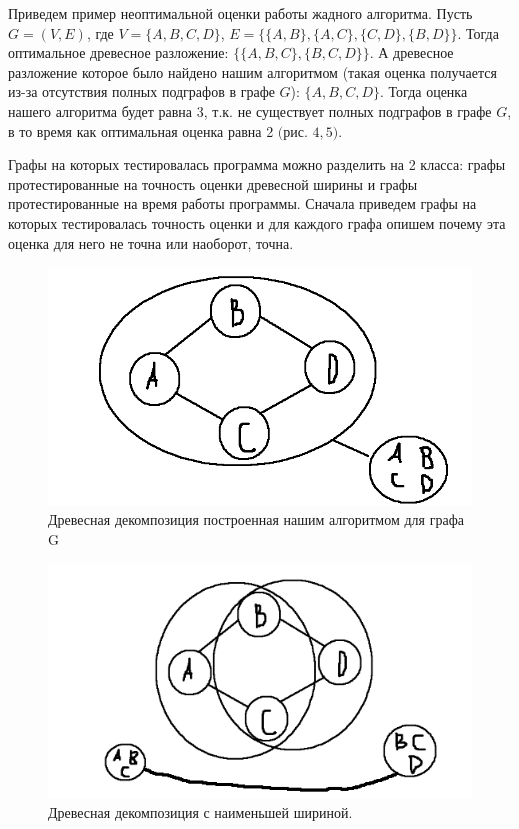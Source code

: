 \documentclass[a4paper,12pt]{article}
\begin{document}
\begin{large}
\begin{large}
		Приведем пример неоптимальной оценки работы жадного алгоритма. 
		Пусть $G=(V, E)$, где $V=\{A, B, C, D\}$, $E=\{\{A, B\}, \{A, C\}, \{C, D\}, \{B, D\}\}$. 
		Тогда оптимальное древесное разложение: $\{\{A, B, C\}, \{B, C, D\}\}$.
		А древесное разложение которое было найдено нашим алгоритмом (такая оценка получается из-за отсутствия полных подграфов в графе $G$): $\{A, B, C, D\}$.
		Тогда оценка нашего алгоритма будет равна 3, т.к. не существует полных подграфов в графе $G$, в то время как оптимальная оценка равна 2 $($рис. $4, 5)$.

		Графы на которых тестировалась программа можно разделить на 2 класса: графы протестированные на точность оценки древесной ширины и графы протестированные на время работы программы.
		Сначала приведем графы на которых тестировалась точность оценки и для каждого графа опишем почему эта оценка для него не точна или наоборот, точна.

		\begin{figure}[htbp]
			\centering
				\includegraphics[scale=0.4]{assessmentOfAlg.png}
				\caption{Древесная декомпозиция построенная нашим алгоритмом для графа G}
				\label{fig:testImage}
		\end{figure}

		\begin{figure}[htbp]
			\centering
				\includegraphics[scale=0.4]{graph_simple_example.png}
				\caption{Древесная декомпозиция с наименьшей шириной.}
				\label{fig:testImage}
		\end{figure}


\end{large}
\end{large}
\end{document}
